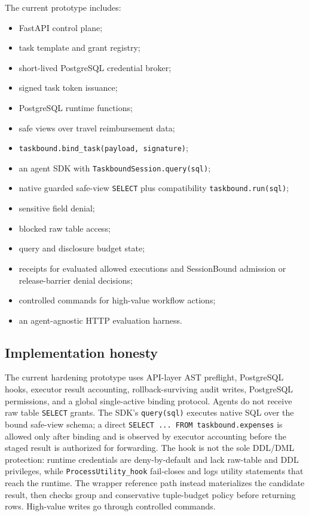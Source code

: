 \documentclass[journal]{IEEEtran}
\providecommand{\tightlist}{%
  \setlength{\itemsep}{0pt}\setlength{\parskip}{0pt}}
\begin{document}
The current prototype includes:

\begin{itemize}
\tightlist
\item
  FastAPI control plane;
\item
  task template and grant registry;
\item
  short-lived PostgreSQL credential broker;
\item
  signed task token issuance;
\item
  PostgreSQL runtime functions;
\item
  safe views over travel reimbursement data;
\item
  \texttt{taskbound.bind\_task(payload,\ signature)};
\item
  an agent SDK with \texttt{TaskboundSession.query(sql)};
\item
  native guarded safe-view \texttt{SELECT} plus compatibility
  \texttt{taskbound.run(sql)};
\item
  sensitive field denial;
\item
  blocked raw table access;
\item
  query and disclosure budget state;
\item
  receipts for evaluated allowed executions and SessionBound admission or
  release-barrier denial decisions;
\item
  controlled commands for high-value workflow actions;
\item
  an agent-agnostic HTTP evaluation harness.
\end{itemize}

\hypertarget{implementation-honesty}{%
\subsection{Implementation
honesty}\label{implementation-honesty}}

The current hardening prototype uses API-layer AST preflight,
PostgreSQL hooks, executor result accounting, rollback-surviving audit
writes, PostgreSQL permissions, and a global single-active binding
protocol. Agents do not receive raw table
\texttt{SELECT} grants. The SDK's \texttt{query(sql)} executes native SQL
over the bound safe-view schema; a direct
\texttt{SELECT ... FROM taskbound.expenses} is allowed only after binding
and is observed by executor accounting before the staged result is
authorized for forwarding.
The hook is not the sole DDL/DML protection: runtime credentials are
deny-by-default and lack raw-table and DDL privileges, while
\texttt{ProcessUtility\_hook} fail-closes and logs utility statements
that reach the runtime.
The wrapper reference path instead materializes the candidate result,
then checks group and conservative tuple-budget policy before returning rows. High-value
writes go through controlled commands.
\end{document}
